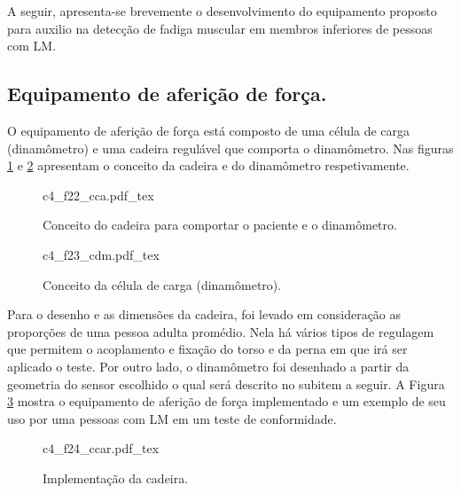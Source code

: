 A seguir, apresenta-se brevemente o desenvolvimento do equipamento proposto para auxilio na detecção de fadiga muscular em membros inferiores de pessoas com \acrshort{LM}.

\subsection*{Equipamento de aferição de força.}
O equipamento de aferição de força está composto de uma célula de carga (dinamômetro) e uma cadeira regulável que comporta o dinamômetro. Nas figuras \ref{fig:c4_f22_cca} e \ref{fig:c4_f23_cdm} apresentam o conceito da cadeira e do dinamômetro respetivamente.

\begin{figure}
    \centering %
    \def\svgwidth{0.75\columnwidth}%
    {c4_f22_cca.pdf_tex}
    \caption{Conceito do cadeira para comportar o paciente e o dinamômetro.}
    \label{fig:c4_f22_cca}
\end{figure}

\begin{figure}
    \centering %
    \def\svgwidth{0.9\columnwidth}%
    {c4_f23_cdm.pdf_tex}
    \caption{Conceito da célula de carga (dinamômetro).}
    \label{fig:c4_f23_cdm}
\end{figure}

Para o desenho e as dimensões da cadeira, foi levado em consideração as proporções de uma pessoa adulta promédio. Nela há vários tipos de regulagem que permitem o acoplamento e fixação do torso e da perna em que irá ser aplicado o teste. Por outro lado, o dinamômetro foi desenhado a partir da geometria do sensor escolhido o qual será descrito no subitem a seguir. A Figura \ref{fig:c4_f24_ccar} mostra o equipamento de aferição de força implementado e um exemplo de seu uso por uma pessoas com \acrshort{LM} em um teste de conformidade.

\begin{figure}
    \centering %
    \small %
    \def\svgwidth{0.9\columnwidth}%
    {c4_f24_ccar.pdf_tex}
    \caption{Implementação da cadeira.}
    \label{fig:c4_f24_ccar}
\end{figure}


